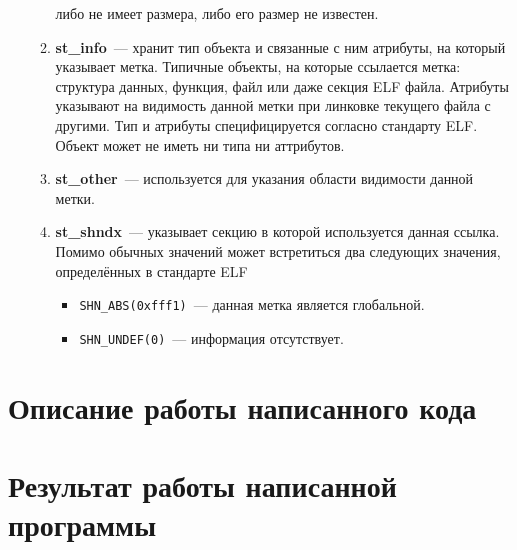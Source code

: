 \documentclass[14pt, russian, onesize]{extreport}
\begin{document}
\begin{itemize}
\begin{enumerate}
                либо не имеет размера, либо его размер не известен.
            \item \textbf{st\_info}~--- хранит тип объекта и связанные с ним
                атрибуты, на который указывает
                метка. 
                Типичные объекты, на которые ссылается метка: структура данных,
                функция, файл или даже секция ELF файла. Атрибуты указывают
                на видимость данной метки при линковке текущего файла с
                другими.
                Тип и атрибуты специфицируется согласно стандарту ELF.
                Объект может не иметь ни типа ни аттрибутов.
            \item \textbf{st\_other}~--- используется для указания
                области видимости данной метки.

            \item \textbf{st\_shndx}~--- указывает секцию в которой 
                 используется данная ссылка. Помимо обычных значений
                 может встретиться два следующих значения, определённых
                 в стандарте ELF
                 \begin{itemize}
                     \item \texttt{SHN\_ABS(0xfff1)}~--- данная метка является 
                         глобальной.
                     \item \texttt{SHN\_UNDEF(0)}~--- информация отсутствует.
                 \end{itemize}

        \end{enumerate}
\end{itemize}

\section*{Описание работы написанного кода}

\section*{Результат работы написанной программы}

\end{document}
